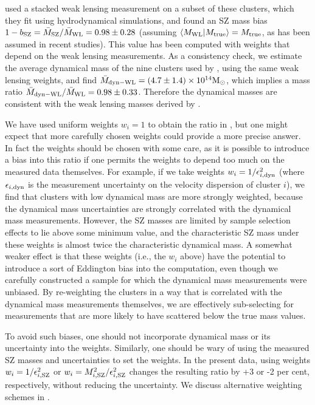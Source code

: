 \cite{battaglia16} used a stacked weak lensing measurement on a subset of these clusters, which 
they fit using hydrodynamical simulations, and found an SZ mass bias $1-b_{\rm 
SZ}=\bar M_{\rm SZ}/\bar M_{\rm WL}=0.98\pm0.28$ (assuming $\langle M_{\rm WL} \vert M_{\rm 
true} \rangle = M_{\rm true}$, as has been assumed in recent studies). This value has been 
computed with weights that depend on the weak lensing measurements. As a consistency check, we 
estimate the average dynamical mass of the nine clusters used by \cite{battaglia16}, using the 
same weak lensing weights, and find $\bar M_{\rm dyn-WL}=(4.7\pm1.4)\times10^{14}{\rm M}_\odot$, which 
implies a mass ratio $\bar M_{\rm dyn-WL}/\bar M_{\rm WL}=0.98\pm0.33$. Therefore the dynamical 
masses are consistent with the weak lensing masses derived by \cite{battaglia16}.

We have used uniform weights $w_i=1$ to obtain the ratio in , but one might 
expect that more carefully chosen weights could provide a more precise answer. In fact the weights 
should be chosen with some care, as it is possible to introduce a bias into this ratio if one 
permits the weights to depend too much on the measured data themselves. For example, if we take 
weights $w_i = 1/\epsilon_{i,{\rm dyn}}^2$ (where $\epsilon_{i,{\rm dyn}}$ is the measurement uncertainty on the velocity dispersion of cluster $i$), we find that clusters with low dynamical mass are more 
strongly weighted, because the dynamical mass uncertainties are strongly correlated with the 
dynamical mass measurements. However, the SZ masses are limited by sample selection effects to lie 
above some minimum value, and the characteristic SZ mass under these weights is almost twice the 
characteristic dynamical mass. A somewhat weaker effect is that these weights (i.e., the $w_i$ 
above) have the potential to introduce a sort of Eddington bias into the computation, even though 
we carefully constructed a sample for which the dynamical mass measurements were unbiased. By 
re-weighting the clusters in a way that is correlated with the dynamical mass measurements 
themselves, we are effectively sub-selecting for measurements that are more likely to have  
scattered below the true mass values.

To avoid such biases, one should not incorporate dynamical mass or its uncertainty into the 
weights. Similarly, one should be wary of using the measured SZ masses and uncertainties to set 
the weights. In the present data, using weights $w_i = 1/\epsilon_{i,{\rm SZ}}^2$ or $w_i =
M_{i,{\rm SZ}}^2/\epsilon_{i,{\rm SZ}}^2$ changes the resulting ratio by +3 or -2 per cent, 
respectively, without reducing the uncertainty. We discuss alternative weighting schemes in 
.


